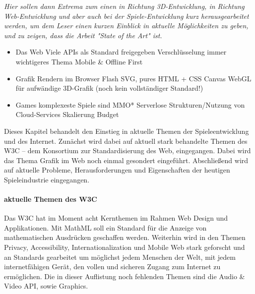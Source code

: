 \emph{Hier sollen dann Extrema zum einen in Richtung 3D-Entwicklung, in Richtung Web-Entwicklung und aber auch bei der Spiele-Entwicklung kurz herausgearbeitet werden, um dem Leser einen kurzen Einblick in aktuelle Möglichkeiten zu geben, und zu zeigen, dass die Arbeit "State of the Art" ist.}
\begin{itemize}
	\item Das Web
		\subitem Viele APIs als Standard freigegeben
		\subitem Verschlüsselung immer wichtigeres Thema
		\subitem Mobile \& Offline First
		\subitem 
	\item Grafik Rendern im Browser
		\subitem Flash
		\subitem SVG, pures HTML + CSS
		\subitem Canvas
		\subitem WebGL für aufwändige 3D-Grafik (noch kein vollständiger Standard!)
	\item Games
		\subitem komplexeste Spiele sind MMO*
		\subitem Serverlose Strukturen/Nutzung von Cloud-Services
		\subitem Skalierung
		\subitem Budget
\end{itemize}

Dieses Kapitel behandelt den Einstieg in aktuelle Themen der Spieleentwicklung und des Internet. Zunächst wird dabei auf aktuell stark behandelte Themen des W3C -- dem Konsortium zur Standardisierung des Web, eingegangen. Dabei wird das Thema Grafik im Web noch einmal gesondert eingeführt. Abschließend wird auf aktuelle Probleme, Herausforderungen und Eigenschaften der heutigen Spieleindustrie eingegangen.

\paragraph{aktuelle Themen des W3C}
Das W3C hat im Moment acht Kernthemen im Rahmen Web Design und Applikationen.
Mit MathML soll ein Standard für die Anzeige von mathematischen Ausdrücken geschaffen werden. Weiterhin wird in den Themen Privacy, Accessibility, Internationalization und Mobile Web stark geforscht und an Standards gearbeitet um möglichst jedem Menschen der Welt, mit jedem internetfähigen Gerät, den vollen und sicheren Zugang zum Internet zu ermöglichen. Die in dieser Auflistung noch fehlenden Themen sind die Audio \& Video API, sowie Graphics.

